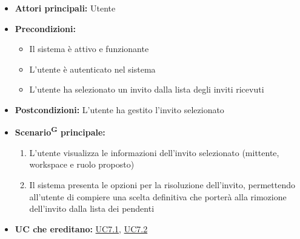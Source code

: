 \documentclass[a4paper, 11pt]{article}
\begin{document}
\begin{itemize}
	\item \textbf{Attori principali:} Utente
	\item \textbf{Precondizioni:} 
	\begin{itemize}
		\item Il sistema è attivo e funzionante
		\item L'utente è autenticato nel sistema
        \item L'utente ha selezionato un invito dalla lista degli inviti ricevuti
	\end{itemize}
    \item \textbf{Postcondizioni:} L'utente ha gestito l'invito selezionato
	\item \textbf{Scenario\textsuperscript{G} principale:}
    \begin{enumerate}
        \item L'utente visualizza le informazioni dell'invito selezionato (mittente, workspace e ruolo proposto)
        \item Il sistema presenta le opzioni per la risoluzione dell'invito, permettendo all'utente di compiere una scelta definitiva che porterà alla rimozione dell'invito dalla lista dei pendenti
    \end{enumerate}
    \item \textbf{UC che ereditano:} \hyperref[UC7.1]{UC7.1}, \hyperref[UC7.2]{UC7.2}
\end{itemize}
\end{document}
